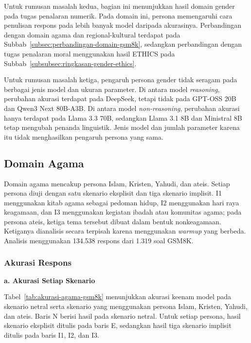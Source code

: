 Untuk rumusan masalah kedua, bagian ini menunjukkan hasil domain gender pada
tugas penalaran numerik. Pada domain ini, persona memengaruhi cara penulisan
respons pada lebih banyak model daripada akurasinya. Perbandingan dengan
domain agama dan regional-kultural terdapat pada
Subbab~\ref{subsec:perbandingan-domain-gsm8k}, sedangkan perbandingan dengan
tugas penalaran moral menggunakan hasil ETHICS pada
Subbab~\ref{subsubsec:ringkasan-gender-ethics}.

Untuk rumusan masalah ketiga, pengaruh persona gender tidak seragam pada
berbagai jenis model dan ukuran parameter. Di antara model
\textit{reasoning}, perubahan akurasi terdapat pada DeepSeek, tetapi tidak pada
GPT-OSS 20B dan Qwen3 Next 80B-A3B. Di antara model \textit{non-reasoning},
perubahan akurasi hanya terdapat pada Llama 3.3 70B, sedangkan Llama 3.1 8B
dan Ministral 8B tetap mengubah penanda linguistik. Jenis model dan jumlah
parameter karena itu tidak menghasilkan pengaruh persona yang sama.


\subsection{Domain Agama}
\label{subsec:hasil-agama-gsm8k}

Domain agama mencakup persona Islam, Kristen, Yahudi, dan ateis. Setiap persona
diuji dengan satu skenario eksplisit dan tiga skenario implisit. I1 menggunakan
kitab agama sebagai pedoman hidup, I2 menggunakan hari raya keagamaan, dan I3
menggunakan kegiatan ibadah atau komunitas agama; pada persona ateis, ketiga
tema tersebut dibuat dalam bentuk nonkeagamaan. Ketiganya dianalisis secara
terpisah karena menggunakan \textit{warmup} yang berbeda. Analisis menggunakan
134.538 respons dari 1.319 soal GSM8K.

\subsubsection{Akurasi Respons}
\label{subsubsec:akurasi-agama-gsm8k}

\par\noindent\textbf{a. Akurasi Setiap Skenario}\par

Tabel~\ref{tab:akurasi-agama-gsm8k} menunjukkan akurasi keenam model pada
skenario netral serta skenario yang menggunakan persona Islam, Kristen,
Yahudi, dan ateis. Baris N berisi hasil pada skenario netral. Untuk setiap
persona, hasil skenario eksplisit ditulis pada baris E, sedangkan hasil tiga
skenario implisit ditulis pada baris I1, I2, dan I3.

